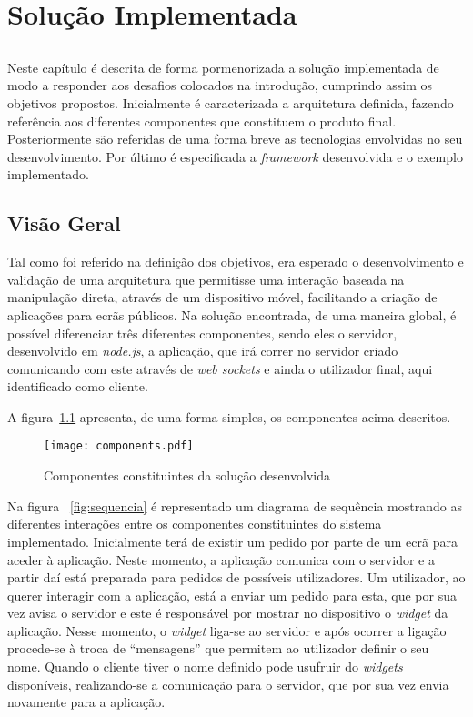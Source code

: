 \chapter{Solução Implementada} \label{chap:sol}

\section*{}

Neste capítulo é descrita de forma pormenorizada a solução implementada de modo a responder aos desafios colocados na introdução, cumprindo assim os objetivos propostos.
Inicialmente é caracterizada a arquitetura definida, fazendo referência aos diferentes componentes que constituem o produto final. Posteriormente são referidas de uma forma breve as tecnologias envolvidas no seu desenvolvimento.
Por último é especificada a \textit{framework} desenvolvida e o exemplo implementado.

\section{Visão Geral} \label{sec:geral}

Tal como foi referido na definição dos objetivos, era esperado o desenvolvimento e validação de uma arquitetura que permitisse uma interação baseada na manipulação direta, através de um dispositivo móvel, facilitando a criação de aplicações para ecrãs públicos.  
Na solução encontrada, de uma maneira global, é possível diferenciar três diferentes componentes, sendo eles o servidor, desenvolvido em \textit{node.js}, a aplicação, que irá correr no servidor criado comunicando com este através de \textit{web sockets} e ainda o utilizador final, aqui identificado como cliente.

A figura~\ref{fig:componentes} apresenta, de uma forma simples, os componentes acima descritos.

\begin{figure}[ht]
\centering
\texttt{[image: components.pdf]}
\caption[Componentes] {Componentes constituintes da solução desenvolvida}
\label{fig:componentes}
\end{figure}

Na figura ~\ref{fig:sequencia} é representado um diagrama de sequência mostrando as diferentes interações entre os componentes constituintes do sistema implementado. Inicialmente terá de existir um pedido por parte de um ecrã para aceder à aplicação. Neste momento, a aplicação comunica com o servidor e a partir daí está preparada para pedidos de possíveis utilizadores. Um utilizador, ao querer interagir com a aplicação, está a enviar um pedido para esta, que por sua vez avisa o servidor e este é responsável por mostrar no dispositivo o \textit{widget} da aplicação. Nesse momento, o \textit{widget} liga-se ao servidor e após ocorrer a ligação procede-se à troca de ``mensagens'' que permitem ao utilizador definir o seu nome. Quando o cliente tiver o nome definido pode usufruir do \textit{widgets} disponíveis, realizando-se a comunicação para o servidor, que por sua vez envia novamente para a aplicação.

